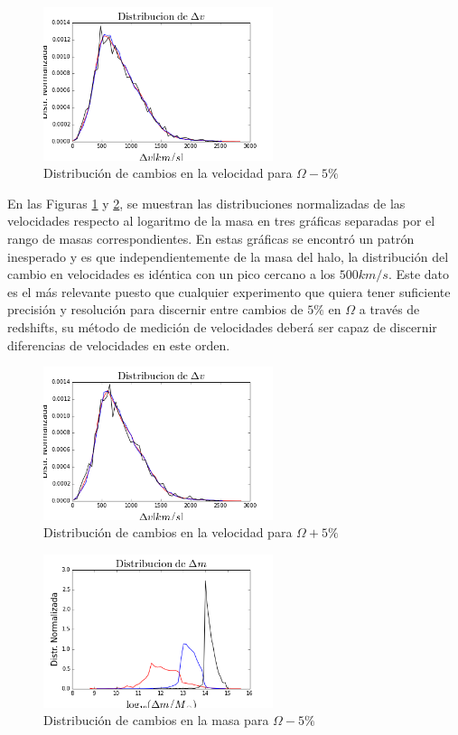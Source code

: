 \begin{figure}[h]
\centering
\includegraphics[width=0.6\textwidth]{Trabajo/deltavmenos}
\caption{Distribución de cambios en la velocidad para $\Omega-5\%$}
\label{fig:deltavmenos}
\end{figure}
En las Figuras \ref{fig:deltavmenos} y \ref{fig:deltavmas}, se muestran las distribuciones normalizadas de las velocidades respecto al logaritmo de la masa en tres gráficas separadas por el rango de masas correspondientes. En estas gráficas se encontró un patrón inesperado y es que independientemente de la masa del halo, la distribución del cambio en velocidades es idéntica con un pico cercano a los $500km/s$. Este dato es el más relevante puesto que cualquier experimento que quiera tener suficiente precisión y resolución para discernir entre cambios de $5\%$ en $\Omega$ a través de redshifts, su método de medición de velocidades deberá ser capaz de discernir diferencias de velocidades en este orden.

\begin{figure}[h]
\centering
\includegraphics[width=0.6\textwidth]{Trabajo/deltavmas}
\caption{Distribución de cambios en la velocidad para $\Omega+5\%$}
\label{fig:deltavmas}
\end{figure}

\begin{figure}[h]
\centering
\includegraphics[width=0.6\textwidth]{Trabajo/deltammenos}
\caption{Distribución de cambios en la masa para $\Omega-5\%$}
\label{fig:deltammenos}
\end{figure}

